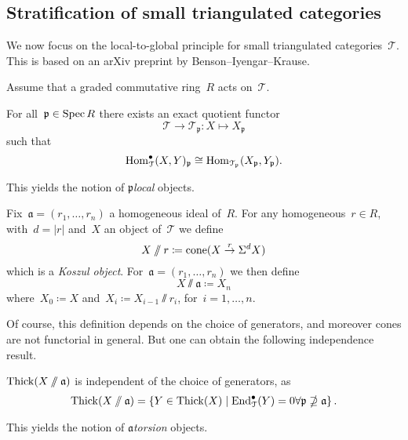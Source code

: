 \documentclass[10pt,a4paper]{article}
\begin{document}
\subsection{Stratification of small triangulated categories}
We now focus on the local-to-global principle for small triangulated categories~$\mathcal{T}$. This is based on an arXiv preprint by Benson--Iyengar--Krause.

Assume that a graded commutative ring~$R$ acts on~$\mathcal{T}$.
\begin{proposition}
  For all~$\mathfrak{p}\in\operatorname{Spec} R$ there exists an exact quotient functor
  \begin{equation}
    \mathcal{T}\to\mathcal{T}_{\mathfrak{p}}:X\mapsto X_{\mathfrak{p}}
  \end{equation}
  such that
  \begin{equation}
    \operatorname{Hom}_{\mathcal{T}}^\bullet(X,Y)_{\mathfrak{p}}\cong\operatorname{Hom}_{\mathcal{T}_{\mathfrak{p}}}(X_{\mathfrak{p}},Y_{\mathfrak{p}}).
  \end{equation}
\end{proposition}
This yields the notion of \emph{$\mathfrak{p}$\dash local} objects.

Fix~$\mathfrak{a}=(r_1,\dotsc,r_n)$ a homogeneous ideal of~$R$. For any homogeneous~$r\in R$, with~$d=|r|$ and~$X$ an object of~$\mathcal{T}$ we define
\begin{equation}
  X\mathbin{/\mkern-6mu/} r\coloneqq\operatorname{cone}(X\overset{r}\to\Sigma^dX)
\end{equation}
which is a \emph{Koszul object}. For~$\mathfrak{a}=(r_1,\dotsc,r_n)$ we then define
\begin{equation}
  X\sslash\mathfrak{a}\coloneqq X_n
\end{equation}
where~$X_0\coloneqq X$ and~$X_i\coloneqq X_{i-1}\sslash r_i$, for~$i=1,\dotsc,n$.

Of course, this definition depends on the choice of generators, and moreover cones are not functorial in general. But one can obtain the following independence result.
\begin{lemma}
  $\operatorname{Thick}(X\mathbin{/\mkern-6mu/}{\mathfrak{a}})$ is independent of the choice of generators, as
  \begin{equation}
    \operatorname{Thick}(X\mathbin{/\mkern-6mu/}\mathfrak{a})=\left\{ Y\in\operatorname{Thick}(X)\mid\operatorname{End}_{\mathcal{T}}^\bullet(Y)=0\forall\mathfrak{p}\nsupseteq\mathfrak{a} \right\}.
  \end{equation}
\end{lemma}
This yields the notion of \emph{$\mathfrak{a}$\dash torsion} objects.
\end{document}
